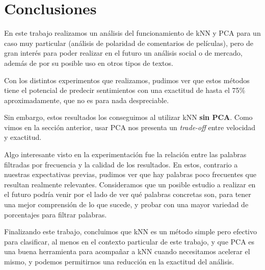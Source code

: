 \section{Conclusiones}

En este trabajo realizamos un análisis del funcionamiento de kNN y PCA para un
caso muy particular (análisis de polaridad de comentarios de películas), pero
de gran interés para poder realizar en el futuro un análisis social o de mercado,
además de por su posible uso en otros tipos de textos.

Con los distintos experimentos que realizamos, pudimos ver que estos
métodos tiene el potencial de predecir sentimientos con una exactitud
de hasta el 75\% aproximadamente, que no es para nada despreciable.

Sin embargo, estos resultados los conseguimos al utilizar kNN \textbf{sin PCA}.
Como vimos en la sección anterior, usar PCA nos presenta un \textit{trade-off}
entre velocidad y exactitud.

Algo interesante visto en la experimentación fue la relación entre las palabras
filtradas por frecuencia y la calidad de los resultados.
En estos, contrario a nuestras expectativas previas, pudimos ver que hay
palabras poco frecuentes que resultan realmente relevantes.
Consideramos que un posible estudio a realizar en el futuro podría venir por
el lado de ver qué palabras concretas son, para tener una mejor comprensión
de lo que sucede, y probar con una mayor variedad de porcentajes para filtrar palabras.

Finalizando este trabajo, concluimos que kNN es un método simple pero efectivo
para clasificar, al menos en el contexto particular de este trabajo, y que
PCA es una buena herramienta para acompañar a kNN cuando necesitamos acelerar
el mismo, y podemos permitirnos una reducción en la exactitud del análisis.
